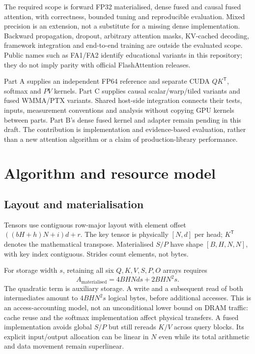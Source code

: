 \documentclass[11pt,a4paper]{article}
\begin{document}
The required scope is forward FP32 materialised, dense fused and causal fused
attention, with correctness, bounded tuning and reproducible evaluation. Mixed
precision is an extension, not a substitute for a missing dense implementation.
Backward propagation, dropout, arbitrary attention masks, KV-cached decoding,
framework integration and end-to-end training are outside the evaluated scope.
Public names such as FA1/FA2 identify educational variants in this repository;
they do not imply parity with official FlashAttention releases.

Part A supplies an independent FP64 reference and separate CUDA $QK^{\mathsf T}$,
softmax and $PV$ kernels. Part C supplies causal scalar/warp/tiled variants and
fused WMMA/PTX variants. Shared host-side integration connects their tests,
inputs, measurement conventions and analysis without copying GPU kernels between
parts. Part B's dense fused kernel and adapter remain pending in this draft.
The contribution is implementation and evidence-based evaluation, rather than
a new attention algorithm or a claim of production-library performance.

\section{Algorithm and resource model}\label{sec:algorithm}
\subsection{Layout and materialisation}
Tensors use contiguous row-major layout with element offset
$((bH+h)N+i)d+r$. The key tensor is physically $[N,d]$ per head;
$K^{\mathsf T}$ denotes the mathematical transpose. Materialised $S/P$ have
shape $[B,H,N,N]$, with key index contiguous. Strides count elements, not bytes.

For storage width $s$, retaining all six $Q,K,V,S,P,O$ arrays requires
\begin{equation}
 A_{\mathrm{materialised}}=4BHNds+2BHN^2s.
 \label{eq:allocation}
\end{equation}
The quadratic term is auxiliary storage. A write and a subsequent read of both
intermediates amount to $4BHN^2s$ logical bytes, before additional accesses.
This is an access-accounting model, not an unconditional lower bound on DRAM
traffic: cache reuse and the softmax implementation affect physical transfers.
A fused implementation avoids global $S/P$ but still rereads $K/V$ across query
blocks. Its explicit input/output allocation can be linear in $N$ even while
its total arithmetic and data movement remain superlinear.
\end{document}
